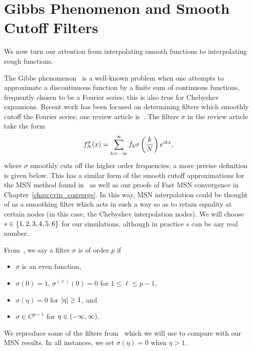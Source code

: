 \section{Gibbs Phenomenon and Smooth Cutoff Filters}

We now turn our attention from interpolating smooth functions
to interpolating rough functions.

The Gibbs phenomenon~\cite[Chapter 2]{zygmund} is a well-known problem
when one attempts to approximate a discontinuous function by a finite sum of
continuous functions, frequently chosen to be a Fourier series;
this is also true for Chebyshev expansions.
Recent work has been focused on determining filters
which smoothly cutoff the Fourier series; one review article
is~\cite{gottlieb1997gibbs}.
The filters $\sigma$ in the review article take the form
%
\begin{equation}
    f_{N}^{\sigma}(x) =
        \sum_{k=-\infty}^{\infty}\hat{f}_{k}\sigma\left( \frac{k}{N} \right)e^{ikx},
\end{equation}
%
where $\sigma$ smoothly cuts off the higher order frequencies;
a more precise definition is given below.
This has a similar form of the smooth cutoff approximations
for the MSN method found in~\cite{msnInterp,msnBirkhoff}
as well as our proofs of Fast MSN convergence in
Chapter~\ref{chap:cvip_converge}.
In this way, MSN interpolation could be thought of as a smoothing
filter which acts in such a way so as to retain equality
at certain nodes (in this case, the Chebyshev interpolation nodes).
We will choose $s\in\left\{ 1,2,3,4,5,6 \right\}$ for our simulations,
although in practice $s$ can be any real number.

From~\cite{gottlieb1997gibbs}, we say a filter $\sigma$ is of order $p$ if
%
\begin{itemize}
\item $\sigma$ is an even function,
\item $\sigma(0) = 1$, $\sigma^{(\ell)}(0) = 0$ for $1\le\ell\le p-1$,
\item $\sigma(\eta) = 0$ for $\left| \eta \right|\ge1$, and
\item $\sigma\in C^{p-1}$ for $\eta\in\left( -\infty,\infty \right)$.
\end{itemize}

\noindent
We reproduce some of the filters from~\cite{gottlieb1997gibbs}
which we will use to compare with our MSN results.
In all instances, we set $\sigma(\eta) = 0$ when $\eta>1$.

